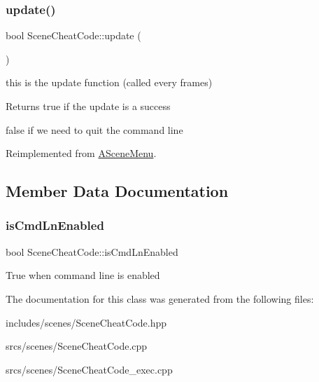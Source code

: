 \subsubsection{\texorpdfstring{update()}{update()}}
{\footnotesize\ttfamily bool Scene\+Cheat\+Code\+::update (\begin{DoxyParamCaption}{ }\end{DoxyParamCaption})\hspace{0.3cm}{\ttfamily [virtual]}}



this is the update function (called every frames) 

\begin{DoxyReturn}{Returns}
true if the update is a success 

false if we need to quit the command line 
\end{DoxyReturn}


Reimplemented from \hyperlink{class_a_scene_menu_a1deeb5fd9be97376998cd2af36f29744}{A\+Scene\+Menu}.



\subsection{Member Data Documentation}
\mbox{\label{class_scene_cheat_code_a296f8798b10214fe5653255d73f2da22}} 
\subsubsection{\texorpdfstring{is\+Cmd\+Ln\+Enabled}{isCmdLnEnabled}}
{\footnotesize\ttfamily bool Scene\+Cheat\+Code\+::is\+Cmd\+Ln\+Enabled}

True when command line is enabled 

The documentation for this class was generated from the following files\+:\begin{DoxyCompactItemize}
\item 
includes/scenes/Scene\+Cheat\+Code.\+hpp\item 
srcs/scenes/Scene\+Cheat\+Code.\+cpp\item 
srcs/scenes/Scene\+Cheat\+Code\+\_\+exec.\+cpp\end{DoxyCompactItemize}

